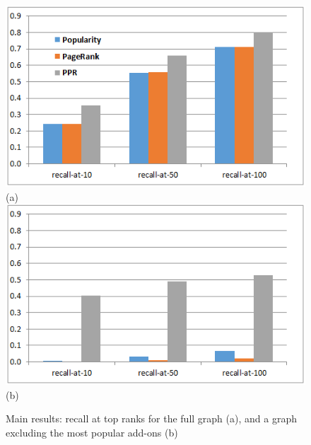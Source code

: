 \documentclass[11pt,oneside]{book}
\begin{document}
\begin{figure}[t]
\centering
	\centering
\includegraphics[scale=0.8]{figures/pop-final.png} \\
(a) \\
	\centering
\includegraphics[scale=0.8]{figures/sans-popular-final.png} \\
(b) \\
	\caption{Main results: recall at top ranks for the full graph (a), and a graph excluding the most popular add-ons (b)}
	\label{fig:main}
\end{figure}
\end{document}
